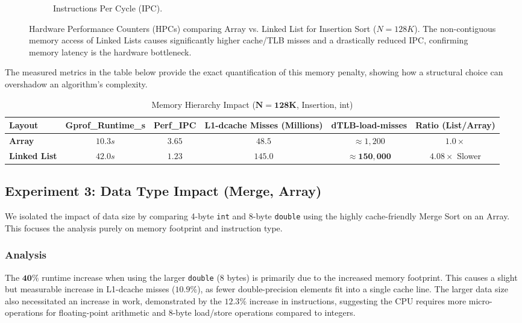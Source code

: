 \documentclass[11pt, a4paper]{article}
\begin{document}
\begin{figure}[h]
\begin{subfigure}[b]{0.32\textwidth}
        \caption{Instructions Per Cycle (IPC).}
        \label{fig:exp2_ipc}
    \end{subfigure}
    \caption{Hardware Performance Counters (HPCs) comparing Array vs. Linked List for Insertion Sort ($N=128K$). The non-contiguous memory access of Linked Lists causes significantly higher cache/TLB misses and a drastically reduced IPC, confirming memory latency is the hardware bottleneck.}
    \label{fig:layout_impact_hpc}
\end{figure}

The measured metrics in the table below provide the exact quantification of this memory penalty, showing how a structural choice can overshadow an algorithm's complexity.

\begin{table}[h]
\centering
\caption{Memory Hierarchy Impact ($\mathbf{N=128K}$, Insertion, int)}
\label{tab:memory_impact}
\begin{tabularx}{\textwidth}{l c c C C C}
\toprule
\textbf{Layout} & \textbf{Gprof\_Runtime\_s} & \textbf{Perf\_IPC} & \textbf{L1-dcache Misses (Millions)} & \textbf{dTLB-load-misses} & \textbf{Ratio (List/Array)} \\
\midrule
\textbf{Array} & $10.3s$ & $\mathbf{3.65}$ & $48.5$ & $\approx 1,200$ & $1.0\times$ \\
\textbf{Linked List} & $42.0s$ & $\mathbf{1.23}$ & $145.0$ & $\mathbf{\approx 150,000}$ & $\mathbf{4.08\times}$ Slower \\
\bottomrule
\end{tabularx}
\end{table}


\subsection{Experiment 3: Data Type Impact (Merge, Array)}
We isolated the impact of data size by comparing 4-byte \texttt{int} and 8-byte \texttt{double} using the highly cache-friendly Merge Sort on an Array. This focuses the analysis purely on memory footprint and instruction type.

\subsubsection{Analysis}
The $\mathbf{40\%}$ runtime increase when using the larger \texttt{double} (8 bytes) is primarily due to the increased memory footprint. This causes a slight but measurable increase in L1-dcache misses ($\mathbf{10.9\%}$), as fewer double-precision elements fit into a single cache line. The larger data size also necessitated an increase in work, demonstrated by the $\mathbf{12.3\%}$ increase in instructions, suggesting the CPU requires more micro-operations for floating-point arithmetic and 8-byte load/store operations compared to integers.
\end{document}
